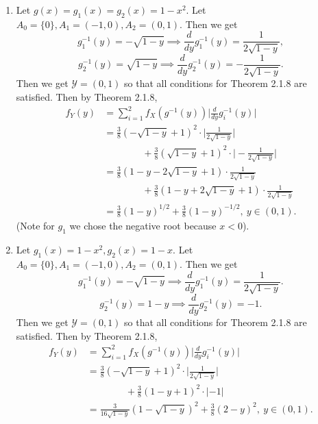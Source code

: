 \documentclass{article}
\begin{document}
\begin{enumerate}
\begin{enumerate}
        \item Let $g(x) = g_1(x) = g_2(x) = 1 - x^2$. Let $A_0 = \{0\}, A_1 = (-1, 0), A_2 = (0, 1)$. Then 
        we get 
        \[ g_{1}^{-1}(y) = -\sqrt{1 - y} \implies \frac{d}{dy}g_{1}^{-1}(y) = \frac{1}{2\sqrt{1 - y}}, \]
        \[ g_{2}^{-1}(y) = \sqrt{1 - y} \implies \frac{d}{dy}g_{2}^{-1}(y) = -\frac{1}{2\sqrt{1 - y}}. \]
        Then we get $\mathcal{Y} = (0, 1)$ so that all conditions for Theorem 2.1.8 are satisfied. Then by 
        Theorem 2.1.8, 
        \begin{align*}
            f_{Y}(y)
            &= \sum_{i = 1}^{2} f_{X}(g^{-1}(y)) \Big| \frac{d}{dy}g_{i}^{-1}(y) \Big| \\
            &= \frac{3}{8}(-\sqrt{1 - y} + 1)^2 \cdot \Big| \frac{1}{2\sqrt{1 - y}} \Big| \\
            &\qquad \qquad + \frac{3}{8}(\sqrt{1 - y} + 1)^2 \cdot \Big| -\frac{1}{2\sqrt{1 - y}} \Big| \\
            &= \frac{3}{8} (1 - y - 2\sqrt{1 - y} + 1) \cdot \frac{1}{2\sqrt{1 - y}} \\
            &\qquad \qquad + \frac{3}{8} ( 1 - y + 2\sqrt{1 - y} + 1) \cdot \frac{1}{2\sqrt{1 - y}} \\
            &= \frac{3}{8}(1 - y)^{1/2} + \frac{3}{8}(1 - y)^{-1/2}, \ y \in (0, 1).
        \end{align*}
        (Note for $g_1$ we chose the negative root because $x < 0$).

        \item Let $g_1(x) = 1 - x^2, g_2(x) = 1 - x$. Let $A_0 = \{0\}, A_1 = (-1, 0), A_2 = (0, 1)$. Then 
        we get 
        \[ g_{1}^{-1}(y) = -\sqrt{1 - y} \implies \frac{d}{dy}g_{1}^{-1}(y) = \frac{1}{2\sqrt{1 - y}}. \]
        \[ g_{2}^{-1}(y) = 1 - y \implies \frac{d}{dy}g_{2}^{-1}(y) = -1. \]
        Then we get $\mathcal{Y} = (0, 1)$ so that all conditions for Theorem 2.1.8 are satisfied. Then by 
        Theorem 2.1.8, 
        \begin{align*}
            f_{Y}(y)
            &= \sum_{i = 1}^{2} f_{X}(g^{-1}(y)) \Big| \frac{d}{dy}g_{i}^{-1}(y) \Big| \\
            &= \frac{3}{8}(-\sqrt{1 - y} + 1)^2 \cdot \Big| \frac{1}{2\sqrt{1 - y}} \Big| \\
            &\qquad \qquad + \frac{3}{8} (1 - y + 1)^2 \cdot |-1| \\
            &= \frac{3}{16\sqrt{1 - y}}(1 - \sqrt{1 - y})^2 + \frac{3}{8}(2 - y)^2, \ y \in (0, 1).
        \end{align*}
    \end{enumerate}


\end{enumerate}
\end{document}
